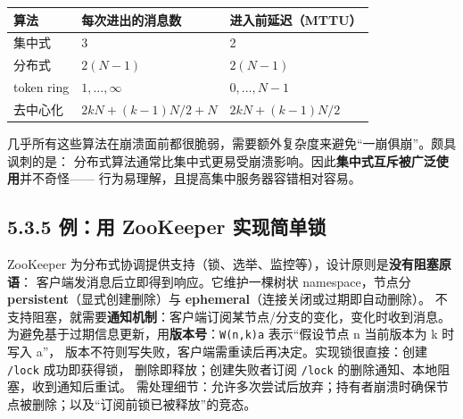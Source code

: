 \begin{ideabox}
\begin{tabular}{@{}lll@{}}
\toprule
算法 & 每次进出的消息数 & 进入前延迟（MTTU） \\
\midrule
集中式 & 3 & 2 \\
分布式 & $2(N-1)$ & $2(N-1)$ \\
token ring & $1, \ldots, \infty$ & $0, \ldots, N-1$ \\
去中心化 & $2kN + (k-1)N/2 + N$ & $2kN + (k-1)N/2$ \\
\bottomrule
\end{tabular}

\smallskip
几乎所有这些算法在崩溃面前都很脆弱，需要额外复杂度来避免“一崩俱崩”。颇具讽刺的是：
分布式算法通常比集中式更易受崩溃影响。因此\textbf{集中式互斥被广泛使用}并不奇怪——
行为易理解，且提高集中服务器容错相对容易。
\end{ideabox}

\subsection*{5.3.5 例：用 ZooKeeper 实现简单锁}
ZooKeeper 为分布式协调提供支持（锁、选举、监控等），设计原则是\textbf{没有阻塞原语}：
客户端发消息后立即得到响应。它维护一棵树状 namespace，节点分
\textbf{persistent}（显式创建删除）与 \textbf{ephemeral}（连接关闭或过期即自动删除）。
不支持阻塞，就需要\textbf{通知机制}：客户端订阅某节点/分支的变化，变化时收到消息。
为避免基于过期信息更新，用\textbf{版本号}：\texttt{W(n,k)a} 表示“假设节点 n 当前版本为 k 时写入 a”，
版本不符则写失败，客户端需重读后再决定。实现锁很直接：创建 \texttt{/lock} 成功即获得锁，
删除即释放；创建失败者订阅 \texttt{/lock} 的删除通知、本地阻塞，收到通知后重试。
需处理细节：允许多次尝试后放弃；持有者崩溃时确保节点被删除；以及“订阅前锁已被释放”的竞态。

\begin{closeread}
\end{closeread}

